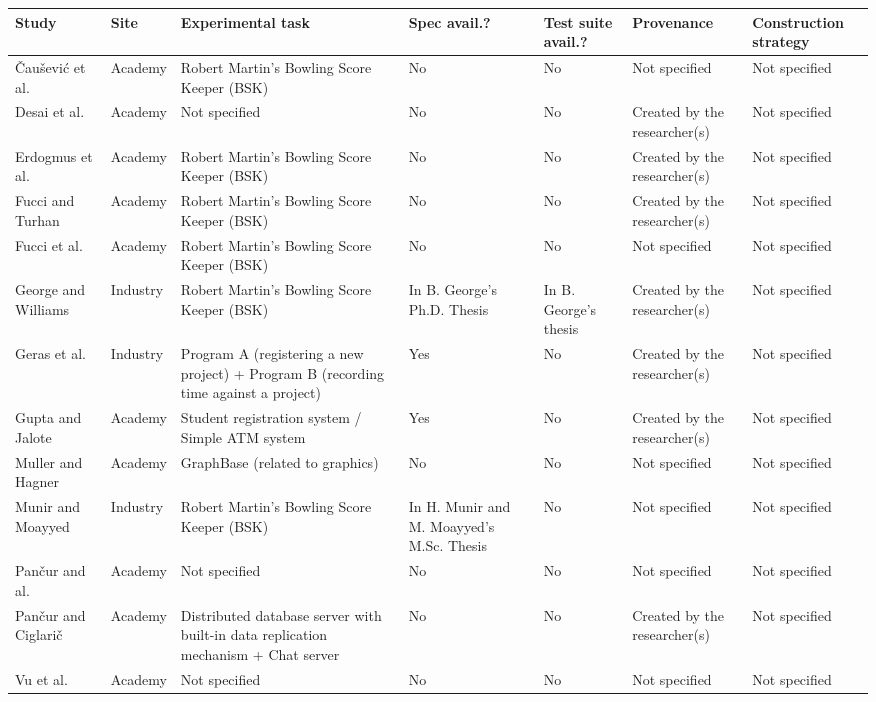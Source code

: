 \begin{tabular}{|p{3cm}|p{1.8cm}|p{7cm}|p{1.8cm}|p{1.8cm}|p{2.5cm}|p{2.5cm}|}
\hline
\textbf{Study} & \textbf{Site} & \textbf{Experimental task} & \textbf{\textbf{Spec avail.?}} & \textbf{Test suite avail.?} & \textbf{Provenance} & \textbf{Construction strategy} \\ \hline
\v Cau\v sevi\'c et al. ~\cite{Causevic2012} & Academy & Robert Martin's Bowling Score Keeper (BSK) & No & No & Not specified & Not specified \\ \hline
Desai et al.~\cite{Desai2009} & Academy & Not specified & No & No & Created by the researcher(s) & Not specified \\ \hline
Erdogmus et al.~\cite{Erdogmus2005} & Academy & Robert Martin's Bowling Score Keeper (BSK) & No & No & Created by the researcher(s) & Not specified \\ \hline
Fucci and Turhan~\cite{Fucci2013} & Academy & Robert Martin's Bowling Score Keeper (BSK) & No & No & Created by the researcher(s) & Not specified \\ \hline
Fucci et al.~\cite{Fucci2016} & Academy & Robert Martin's Bowling Score Keeper (BSK) & No & No & Not specified & Not specified \\ \hline
George and Williams~\cite{George2004} & Industry & Robert Martin's Bowling Score Keeper (BSK) & In B. George's Ph.D. Thesis~\cite{George2002} & In B. George's thesis~\cite{George2002} & Created by the researcher(s) & Not specified \\ \hline
Geras et al.~\cite{Geras2004} & Industry & Program A (registering a new project) + Program B (recording time against a project) & Yes & No & Created by the researcher(s) & Not specified \\ \hline
Gupta and Jalote~\cite{Gupta2007} & Academy & Student registration system / Simple ATM system & Yes & No & Created by the researcher(s) & Not specified \\ \hline
Muller and Hagner~\cite{Muller2002} & Academy & GraphBase (related to graphics) & No & No & Not specified & Not specified \\ \hline
Munir and Moayyed~\cite{Munir2014} & Industry & Robert Martin's Bowling Score Keeper (BSK) & In H. Munir and M. Moayyed's M.Sc. Thesis \cite{Munir2012} & No & Not specified & Not specified \\ \hline
Pan\v cur and al.~\cite{Pancur2003} & Academy & Not specified & No & No & Not specified & Not specified \\ \hline
Pan\v cur and Ciglari\v c~\cite{Pancur2011} & Academy & Distributed database server with built-in data replication mechanism + Chat server & No & No & Created by the researcher(s) & Not specified \\ \hline
Vu et al.~\cite{Vu2009} & Academy & Not specified & No & No & Not specified & Not specified \\ \hline
\end{tabular}
